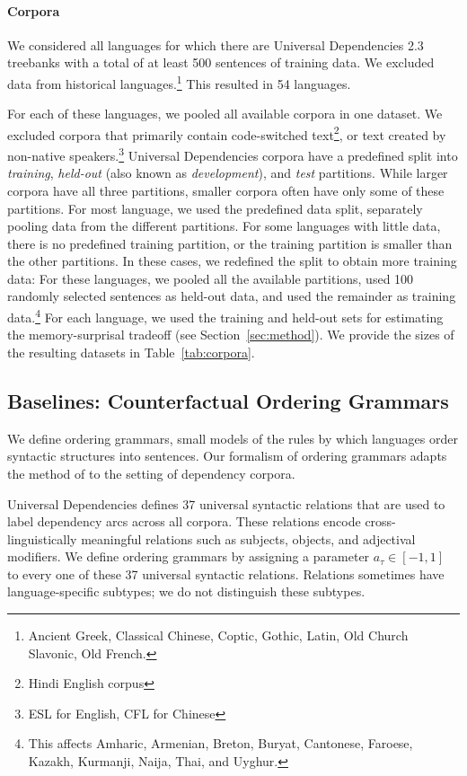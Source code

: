 \paragraph{Corpora}
We considered all languages for which there are Universal Dependencies 2.3 treebanks with a total of at least 500 sentences of training data.
We excluded data from historical languages.\footnote{Ancient Greek, Classical Chinese, Coptic, Gothic, Latin, Old Church Slavonic, Old French.}
This resulted in 54 languages.

For each of these languages, we pooled all available corpora in one dataset.
We excluded corpora that primarily contain code-switched text\footnote{Hindi English corpus}, or text created by non-native speakers.\footnote{ESL for English, CFL for Chinese}
Universal Dependencies corpora have a predefined split into \emph{training}, \emph{held-out} (also known as \emph{development}), and \emph{test} partitions.
While larger corpora have all three partitions, smaller corpora often have only some of these partitions.
For most language, we used the predefined data split, separately pooling data from the different partitions. %
For some languages with little data, there is no predefined training partition, or the training partition is smaller than the other partitions.
In these cases, we redefined the split to obtain more training data:
For these languages, we pooled all the available partitions, used 100 randomly selected sentences as held-out data, and used the remainder as training data.\footnote{This affects Amharic, Armenian, Breton, Buryat, Cantonese, Faroese, Kazakh, Kurmanji, Naija, Thai, and Uyghur.}
For each language, we used the training and held-out sets for estimating the memory-surprisal tradeoff (see Section~\ref{sec:method}).
We provide the sizes of the resulting datasets in Table~\ref{tab:corpora}.



\subsection{Baselines: Counterfactual Ordering Grammars}
We define ordering grammars, small models of the rules by which languages order syntactic structures into sentences.
Our formalism of ordering grammars adapts the method of \cite{gildea-optimizing-2007, gildea-grammars-2010, gildea-human-2015} to the setting of dependency corpora.

Universal Dependencies defines 37 universal syntactic relations that are used to label dependency arcs across all corpora.
These relations encode cross-linguistically meaningful relations such as subjects, objects, and adjectival modifiers.
We define ordering grammars by assigning a parameter $a_\tau \in [-1,1]$ to every one of these 37 universal syntactic relations.
Relations sometimes have language-specific subtypes; we do not distinguish these subtypes.

